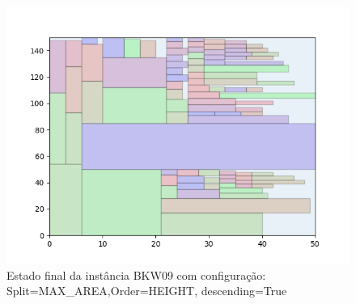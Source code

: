 \begin{figure}[H]
    \centering
    \caption[]{Estado final da instância BKW09 com configuração: Split=MAX_AREA,Order=HEIGHT, descending=True}
    \label{fig:bkw09-max_area-height-true}
    \includegraphics[scale=0.5]{output/figures/bkw/bkw09/max_area/height/true/000}
\end{figure}